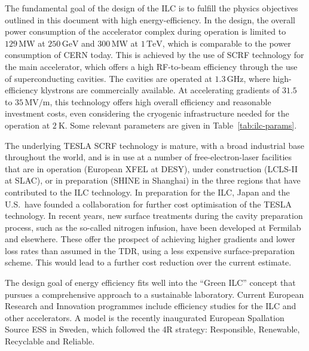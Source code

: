 \documentclass[%
reprint,
 floatfix,
 amsmath,amssymb,
 aps,
]{revtex4-1}
\begin{document}
The fundamental goal of the design of the ILC is to fulfill the
physics objectives outlined in this document  with high energy-efficiency.  In the design,
the overall power consumption of the accelerator complex during operation is limited to $129\,{\mathrm{MW}}$ at  $250\,{\mathrm{GeV}}$ and $300\,{\mathrm{MW}}$ at  $1\,{\mathrm{TeV}}$, which is comparable to the power consumption of CERN today.
This is achieved by the use of SCRF technology for the main
accelerator, which offers a high RF-to-beam efficiency through the use
of superconducting cavities.  The cavities are operated at 
 $1.3\,{\mathrm{GHz}}$, where high-efficiency klystrons are commercially available.
At accelerating gradients of $31.5$ to $35\,{\mathrm{MV/m}}$, this
technology offers high overall efficiency and reasonable investment
costs, even considering the cryogenic infrastructure needed for the
operation 
at $2~\mathrm{K}$. Some relevant parameters are given in Table~\ref{tab:ilc-params}.

The underlying TESLA SCRF technology is mature, with a broad industrial
base throughout the world, and is in use at a number of free-electron-laser
facilities that are in operation (European XFEL at DESY), under construction (LCLS-II at SLAC),
 or in preparation (SHINE in Shanghai) in the three regions that have
 contributed to the ILC technology. In preparation for the ILC, Japan and
 the U.S.\ 
have founded a collaboration for further cost optimisation of the TESLA technology.
In recent years, new surface treatments during the cavity preparation
process, such as the so-called nitrogen infusion, have been 
developed at Fermilab and elsewhere.
These offer the prospect of  achieving  higher gradients and lower loss
rates than
assumed in the TDR, using a less expensive surface-preparation scheme.
This  would lead to a
 further cost reduction over
the current
 estimate.
 
 The design goal of energy efficiency fits well into the ``Green ILC'' concept \cite{GreenILC} that pursues a comprehensive approach to a sustainable laboratory.  Current European Research and Innovation programmes include
 efficiency studies for the ILC and other accelerators. 
A model is the recently inaugurated European Spallation Source ESS in Sweden, which followed the 4R strategy: Responsible, Renewable, Recyclable and Reliable.
\end{document}
